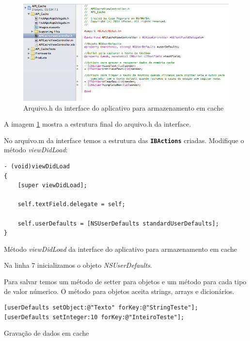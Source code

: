 \documentclass[a4paper,12pt,brazil,doubleside]{book}
\begin{document}
\begin{singlespace}
\begin{figure}[H]
  \centering
  \includegraphics[width=\textwidth]{figuras/4/app_interface_estrutura_h.png}
  \caption{Arquivo.h da interface do aplicativo para armazenamento em cache}
  \label{fig:app_interface_estrutura_h}
\end{figure}


A imagem \ref{fig:app_interface_estrutura_h} mostra a estrutura final do arquivo.h da interface.


No arquivo.m da interface temos a estrutura das \texttt{\textbf{IBActions}} criadas.
Modifique o método \emph{viewDidLoad}:

\begin{listing}[H]
\begin{verbatim}
- (void)viewDidLoad
{
    [super viewDidLoad];
    
    self.textField.delegate = self;
  
    self.userDefaults = [NSUserDefaults standardUserDefaults];
}
\end{verbatim}
\caption{Método \emph{viewDidLoad} da interface do aplicativo para armazenamento em cache}
\end{listing}


Na linha 7 inicializamos o objeto \emph{NSUserDefaults}.


Para salvar temos um método de setter para objetos e um método para cada tipo de valor númerico. O método para objetos aceita strings, arrays e dicionários.

\begin{listing}[H]
\begin{verbatim}
[userDefaults setObject:@"Texto" forKey:@"StringTeste"];
[userDefaults setInteger:10 forKey:@"InteiroTeste"];
\end{verbatim}
\caption{Gravação de dados em cache}
\end{listing}



\end{singlespace}
\end{document}
